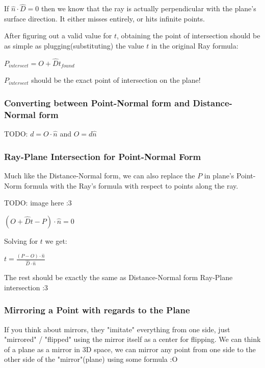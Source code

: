 \sgap

If $\hat{n} \cdot \hat{D} = 0$ then we know that the ray is actually perpendicular with
the plane's surface direction. It either misses entirely, or hits infinite points.

\sgap

After figuring out a valid value for $t$, obtaining the point of intersection should be as simple as
plugging(substituting) the value $t$ in the original Ray formula:

\begin{center}
    $P_{intersect}=O+\hat{D}t_{found}$
\end{center}

$P_{intersect}$ should be the exact point of intersection on the plane!

\subsubsection{Converting between Point-Normal form and Distance-Normal form}
TODO: $d=O \cdot \hat{n}$ and $O = d \hat{n}$

\subsubsection{Ray-Plane Intersection for Point-Normal Form}
Much like the Distance-Normal form, we can also replace the $P$ in plane's Point-Norm formula with the Ray's formula with respect to points along the ray.

TODO: image here :3

\begin{center}
    $(O + \hat{D}t - P) \cdot \hat{n} = 0$
\end{center}

Solving for $t$ we get:
\begin{center}
    $t = \frac{(P - O) \cdot \hat{n}}{\hat{D} \cdot \hat{n}}$
\end{center}

The rest should be exactly the same as Distance-Normal form Ray-Plane intersection :3


\subsubsection{Mirroring a Point with regards to the Plane}
If you think about mirrors, they "imitate" everything from one side, just "mirrored" / "flipped" using the mirror itself
as a center for flipping. We can think of a plane as a mirror in 3D space, we can mirror any point from one side to the other side
of the "mirror"(plane) using some formula :O

